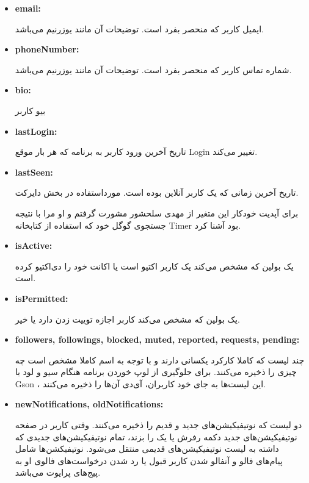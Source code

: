 \documentclass[12pt]{article}
\begin{document}
\begin{itemize}
\item
\begin{latin}
\textbf{email:}
\end{latin}
ایمیل کاربر که منحصر بفرد است. توضیحات آن مانند یوزرنیم می‌باشد.

\item
\begin{latin}
\textbf{phoneNumber:}
\end{latin}
شماره تماس کاربر که منحصر بفرد است. توضیحات آن مانند یوزرنیم می‌باشد.

\item
\begin{latin}
\textbf{bio:}
\end{latin}
بیو کاربر

\item
\begin{latin}
\textbf{lastLogin:}
\end{latin}
تاریخ آخرین ورود کاربر به برنامه که هر بار موقع Login تغییر می‌کند.

\item
\begin{latin}
\textbf{lastSeen:}
\end{latin}
تاریخ آخرین زمانی که یک کاربر آنلاین بوده است. مورداستفاده در بخش دایرکت.

برای آپدیت خودکار این متغیر از مهدی سلحشور مشورت گرفتم و او مرا با نتیجه جستجوی گوگل خود که استفاده از کتابخانه Timer بود آشنا کرد.

\item
\begin{latin}
\textbf{isActive:}
\end{latin}
یک بولین که مشخص می‌کند یک کاربر اکتیو است یا اکانت خود را دی‌اکتیو کرده است.

\item
\begin{latin}
\textbf{isPermitted:}
\end{latin}
یک بولین که مشخص می‌کند کاربر اجازه توییت زدن دارد یا خیر.

\item
\begin{latin}
\textbf{followers, followings, blocked, muted, reported, requests, pending:}
\end{latin}
چند لیست که کاملا کارکرد یکسانی دارند و با توجه به اسم کاملا مشخص است چه چیزی را ذخیره می‌کنند. برای جلوگیری از لوپ خوردن برنامه هنگام سیو و لود با Gson ، این لیست‌ها به جای خود کاربران، آی‌دی آن‌ها را ذخیره می‌کنند.

\item
\begin{latin}
\textbf{newNotifications, oldNotifications:}
\end{latin}
دو لیست که نوتیفیکیشن‌های جدید و قدیم را ذخیره می‌کنند. وقتی کاربر در صفحه نوتیفیکیشن‌های جدید دکمه رفرش یا یک را بزند، تمام نوتیفیکیشن‌های جدیدی که داشته به لیست نوتیفیکیشن‌های قدیمی منتقل می‌شود. نوتیفیکشن‌ها شامل پیام‌های فالو و آنفالو شدن کاربر قبول یا رد شدن درخواست‌های فالوی او به پیج‌های پرایوت می‌باشد.


\end{itemize}
\end{document}
